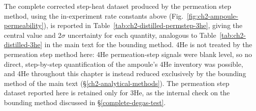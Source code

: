 The complete corrected step-heat dataset produced by the permeation step
method, using the in-experiment rate constants above
(Fig.~\ref{fig:ch2-ampoule-permeability}), is reported in
Table~\ref{tab:ch2-distilled-permstep-3he}, giving the central value and
2$\sigma$ uncertainty for each quantity, analogous to
Table~\ref{tab:ch2-distilled-3he} in the main text for the bounding method.
4He is not treated by the permeation step method here: 4He
permeation-step signals were blank level,
so no direct, step-by-step quantification of the ampoule's 4He inventory was
possible, and 4He throughout this chapter is instead reduced exclusively by
the bounding method of the main text (\S\ref{ch2-analytical-methods}). The
permeation step dataset reported here is retained only for 3He,
as the internal check on the bounding method discussed in
\S\ref{complete-degas-test}. 

